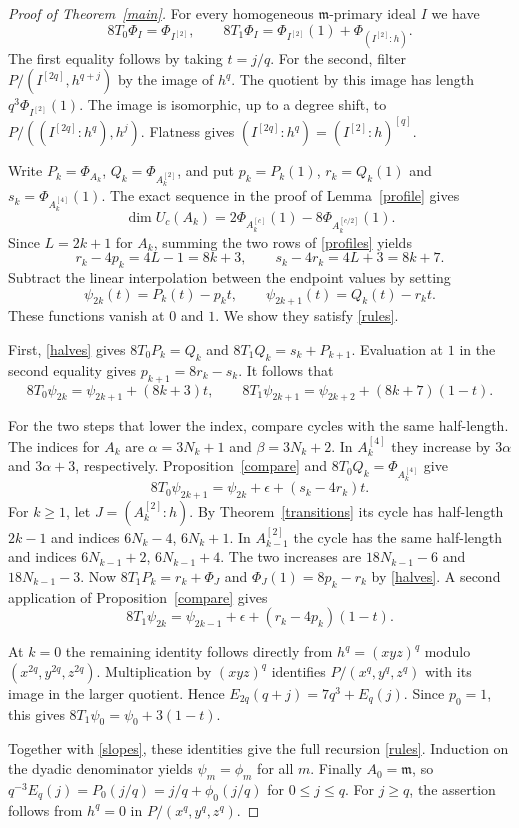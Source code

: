 \documentclass[11pt,a4paper,reqno]{amsart}
\numberwithin{equation}{section}
\theoremstyle{plain}
\newcommand{\m}{\mathfrak m}
\begin{document}
\begin{proof}[Proof of Theorem~\ref{main}]
For every homogeneous $\m$-primary ideal $I$ we have
\begin{equation}\label{halves}
 8T_0 \Phi_I= \Phi_{I^{[2]}},\qquad
 8T_1 \Phi_I= \Phi_{I^{[2]}}(1)+\Phi_{(I^{[2]}:h)} .
\end{equation}
The first equality follows by taking $t=j/q$. For the second, filter $P/(I^{[2q]},h^{q+j})$ by the image of $h^q$. The quotient by this image has length $q^3\Phi_{I^{[2]}}(1)$. The image is isomorphic, up to a degree shift, to $P/((I^{[2q]}:h^q),h^j)$. Flatness gives $(I^{[2q]}:h^q)=(I^{[2]}:h)^{[q]}$.

Write $P_k=\Phi_{A_k}$, $Q_k=\Phi_{A_k^{[2]}}$, and put $p_k=P_k(1)$, $r_k=Q_k(1)$ and $s_k=\Phi_{A_k^{[4]}}(1)$. The exact sequence in the proof of Lemma~\ref{profile} gives
\[
 \dim U_c(A_k)=2\Phi_{A_k^{[c]}}(1)-8\Phi_{A_k^{[c/2]}}(1).
\]
Since $L=2k+1$ for $A_k$, summing the two rows of \eqref{profiles} yields
\begin{equation}\label{slopes}
 r_k-4p_k=4L-1=8k+3,\qquad s_k-4r_k=4L+3=8k+7 .
\end{equation}
Subtract the linear interpolation between the endpoint values by setting
\[
 \psi_{2k}(t)=P_k(t)-p_kt,\qquad
 \psi_{2k+1}(t)=Q_k(t)-r_kt .
\]
These functions vanish at $0$ and $1$. We show they satisfy \eqref{rules}.

First, \eqref{halves} gives $8T_0P_k=Q_k$ and $8T_1Q_k=s_k+P_{k+1}$. Evaluation at $1$ in the second equality gives $p_{k+1}=8r_k-s_k$. It follows that
\[
 8T_0\psi_{2k}=\psi_{2k+1}+(8k+3)t,\qquad
 8T_1\psi_{2k+1}=\psi_{2k+2}+(8k+7)(1-t).
\]

For the two steps that lower the index, compare cycles with the same half-length. The indices for $A_k$ are $\alpha=3N_k+1$ and $\beta=3N_k+2$. In $A_k^{[4]}$ they increase by $3\alpha$ and $3\alpha+3$, respectively. Proposition~\ref{compare} and $8T_0Q_k=\Phi_{A_k^{[4]}}$ give
\[
 8T_0\psi_{2k+1}=\psi_{2k}+\epsilon+(s_k-4r_k)t .
\]
For $k\ge1$, let $J=(A_k^{[2]}:h)$. By Theorem~\ref{transitions} its cycle has half-length $2k-1$ and indices $6N_k-4$, $6N_k+1$. In $A_{k-1}^{[2]}$ the cycle has the same half-length and indices $6N_{k-1}+2$, $6N_{k-1}+4$. The two increases are $18N_{k-1}-6$ and $18N_{k-1}-3$. Now $8T_1P_k=r_k+\Phi_J$ and $\Phi_J(1)=8p_k-r_k$ by \eqref{halves}. A second application of Proposition~\ref{compare} gives
\[
 8T_1\psi_{2k}=\psi_{2k-1}+\epsilon+(r_k-4p_k)(1-t).
\]

At $k=0$ the remaining identity follows directly from $h^q=(xyz)^q$ modulo $(x^{2q},y^{2q},z^{2q})$. Multiplication by $(xyz)^q$ identifies $P/(x^q,y^q,z^q)$ with its image in the larger quotient. Hence $E_{2q}(q+j)=7q^3+E_q(j)$. Since $p_0=1$, this gives $8T_1\psi_0=\psi_0+3(1-t)$.

Together with \eqref{slopes}, these identities give the full recursion \eqref{rules}. Induction on the dyadic denominator yields $\psi_m=\phi_m$ for all $m$. Finally $A_0=\m$, so $q^{-3}E_q(j)=P_0(j/q)=j/q+\phi_0(j/q)$ for $0\le j\le q$. For $j\ge q$, the assertion follows from $h^q=0$ in $P/(x^q,y^q,z^q)$.
\end{proof}
\end{document}
